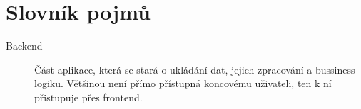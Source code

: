 \chapter{Slovník pojmů}
\begin{description} %
	\item[Backend] Část aplikace, která se stará o ukládání dat, jejich zpracování a bussiness logiku. Většinou není přímo přístupná koncovému uživateli, ten k ní přistupuje přes frontend.
\end{description}